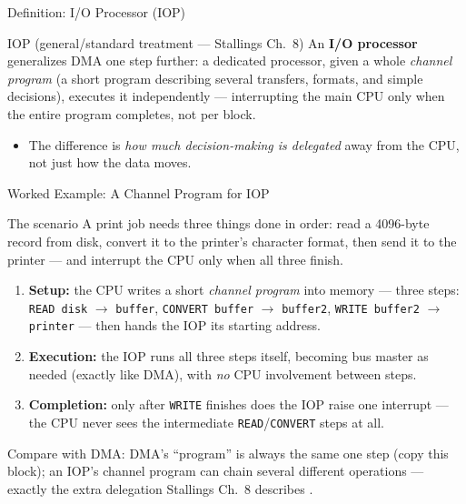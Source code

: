 \documentclass[aspectratio=169]{beamer}
\begin{document}
\begin{frame}{Definition: I/O Processor (IOP)}
  \begin{block}{IOP (general/standard treatment --- Stallings Ch.~8)}
    An \textbf{I/O processor} generalizes DMA one step further: a dedicated
    processor, given a whole \emph{channel program} (a short program
    describing several transfers, formats, and simple decisions), executes it
    independently --- interrupting the main CPU only when the entire program
    completes, not per block.
  \end{block}
  \begin{itemize}
    \item The difference is \emph{how much decision-making is delegated} away
      from the CPU, not just how the data moves.
  \end{itemize}
\end{frame}

\begin{frame}{Worked Example: A Channel Program for IOP}
  \begin{block}{The scenario}
    A print job needs three things done in order: read a 4096-byte record
    from disk, convert it to the printer's character format, then send it to
    the printer --- and interrupt the CPU only when all three finish.
  \end{block}
  \begin{enumerate}
    \item \textbf{Setup:} the CPU writes a short \emph{channel program} into
      memory --- three steps: \texttt{READ disk} $\to$ \texttt{buffer},
      \texttt{CONVERT buffer} $\to$ \texttt{buffer2}, \texttt{WRITE buffer2}
      $\to$ \texttt{printer} --- then hands the IOP its starting address.
    \item \textbf{Execution:} the IOP runs all three steps itself, becoming
      bus master as needed (exactly like DMA), with \emph{no} CPU
      involvement between steps.
    \item \textbf{Completion:} only after \texttt{WRITE} finishes does the
      IOP raise one interrupt --- the CPU never sees the intermediate
      \texttt{READ}/\texttt{CONVERT} steps at all.
  \end{enumerate}
  Compare with DMA: DMA's ``program'' is always the same one step
  (copy this block); an IOP's channel program can chain several different
  operations --- exactly the extra delegation Stallings Ch.~8 describes
  \cite{Stallings2015_computer_organization}.
\end{frame}
\end{document}

